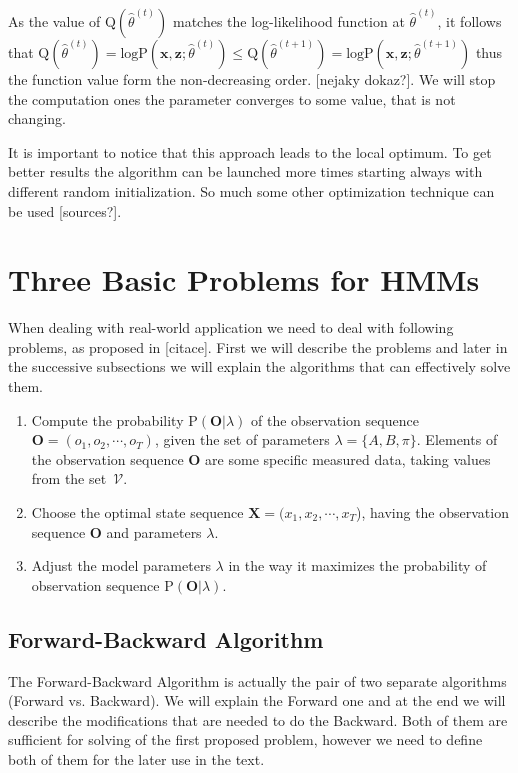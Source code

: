 \documentclass[thesis=M,english]{FITthesis}[2012/10/20]
\newcommand{\matr}[1]{\mathbf{#1}}
\begin{document}
As the value of $\mathrm{Q}(\hat\theta^{(t)})$ matches the log-likelihood function at $\hat\theta^{(t)}$, it follows that $ \mathrm{Q}(\hat\theta^{(t)}) =  \mathrm{logP}(\mathbf{x},\mathbf{z};\hat \theta^{(t)}) \leq \mathrm{Q}(\hat\theta^{(t+1)}) =  \mathrm{logP}(\mathbf{x},\mathbf{z};\hat \theta^{(t+1)}) $ thus the function value form the non-decreasing order. [nejaky dokaz?]. We will stop the computation ones the parameter converges to some value, that is not changing.  

It is important to notice that this approach leads to the local optimum. To get better results the algorithm can be launched more times starting always with different random initialization. So much some other optimization technique can be used [sources?]. 

\section{Three Basic Problems for HMMs}\label{sec:3p}
When dealing with real-world application we need to deal with following problems, as proposed in [citace]. First we will describe the problems and later in the successive subsections we will explain the algorithms that can effectively solve them. 

\begin{enumerate}
\item Compute the probability $\mathrm{P}(\matr{O}|\lambda) $ of the observation sequence \\ $\matr{O} = (o_1,o_2,\cdots,o_T)$, given the set of parameters $\lambda = \{A,B,\pi\}$. Elements of the observation sequence $\matr{O}$ are some specific measured data, taking values from the set~$\mathcal{V}$.   
\item Choose the optimal state sequence $\matr{X} = (x_1,x_2,\cdots,x_T$), having the observation sequence $\matr{O}$ and parameters $\lambda$.
\item Adjust the model parameters $\lambda$ in the way it maximizes the probability of observation sequence $ \mathrm{P}(\matr{O}|\lambda) $. 
\end{enumerate}


\subsection{Forward-Backward Algorithm}\label{sec:fb}
The Forward-Backward Algorithm is actually the pair of two separate algorithms (Forward vs. Backward). We will explain the Forward one and at the end we will describe the modifications that are needed to do the Backward. Both of them are sufficient for solving of the first proposed problem, however we need to define both of them for the later use in the text.  
\end{document}
